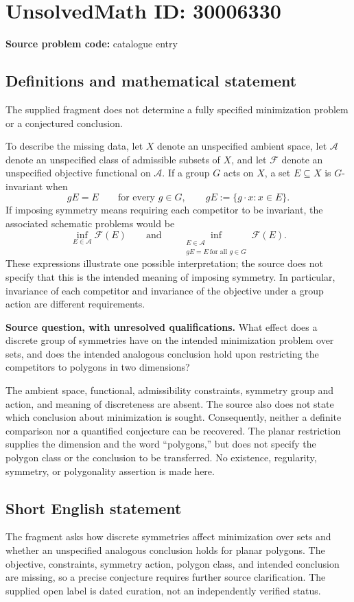 \documentclass[11pt]{article}
\begin{document}
\section*{UnsolvedMath ID: 30006330}
\textbf{Source problem code:} catalogue entry
\subsection{Definitions and mathematical statement}
The supplied fragment does not determine a fully specified minimization problem or a conjectured conclusion.

To describe the missing data, let \(X\) denote an unspecified ambient space, let \(\mathcal A\) denote an unspecified class of admissible subsets of \(X\), and let \(\mathcal F\) denote an unspecified objective functional on \(\mathcal A\). If a group \(G\) acts on \(X\), a set \(E\subseteq X\) is \(G\)-invariant when
\[
 gE=E\qquad\text{for every }g\in G,
 \qquad gE:=\{g\cdot x:x\in E\}.
\]
If imposing symmetry means requiring each competitor to be invariant, the associated schematic problems would be
\[
 \inf_{E\in\mathcal A}\mathcal F(E)
 \qquad\text{and}\qquad
 \inf_{\substack{E\in\mathcal A\\ gE=E\ \text{for all }g\in G}}\mathcal F(E).
\]
These expressions illustrate one possible interpretation; the source does not specify that this is the intended meaning of imposing symmetry. In particular, invariance of each competitor and invariance of the objective under a group action are different requirements.

\textbf{Source question, with unresolved qualifications.} What effect does a discrete group of symmetries have on the intended minimization problem over sets, and does the intended analogous conclusion hold upon restricting the competitors to polygons in two dimensions?

The ambient space, functional, admissibility constraints, symmetry group and action, and meaning of discreteness are absent. The source also does not state which conclusion about minimization is sought. Consequently, neither a definite comparison nor a quantified conjecture can be recovered. The planar restriction supplies the dimension and the word ``polygons,'' but does not specify the polygon class or the conclusion to be transferred. No existence, regularity, symmetry, or polygonality assertion is made here.
\subsection{Short English statement}
The fragment asks how discrete symmetries affect minimization over sets and whether an unspecified analogous conclusion holds for planar polygons. The objective, constraints, symmetry action, polygon class, and intended conclusion are missing, so a precise conjecture requires further source clarification. The supplied open label is dated curation, not an independently verified status.
\end{document}
